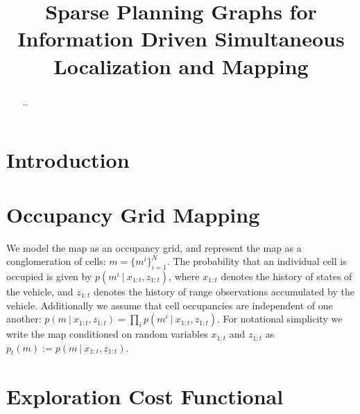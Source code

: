 \documentclass{article}
\begin{document}
\title{Sparse Planning Graphs for Information Driven Simultaneous Localization and Mapping}


\maketitle

\begin{abstract}
  \boldmath
  \dots
\end{abstract}

\section{Introduction}
\label{section:introduction}

\section{Occupancy Grid Mapping}
\label{section:occupancy_grid_mapping}

We model the map as an occupancy grid, and represent the map as a conglomeration of cells: $m = \{m^{i}\}_{i=1}^{N}$. The probability that an individual cell is occupied is given by $p\left(m^{i} \ \vert \ x_{1:t}, z_{1:t}\right)$, where $x_{1:t}$ denotes the history of states of the vehicle, and $z_{1:t}$ denotes the history of range observations accumulated by the vehicle. Additionally we assume that cell occupancies  are independent of one another: $p\left(m \ \vert \ x_{1:t}, z_{1:t}\right) = \prod_{i} p\left(m^{i} \ \vert \ x_{1:t}, z_{1:t}\right)$. For notational simplicity we write the map conditioned on random variables $x_{1:t}$ and $z_{1:t}$ as $p_{t}\left(m\right) := p\left(m \ \vert \ x_{1:t}, z_{1:t}\right)$.

\section{Exploration Cost Functional}
\label{section:exploration_cost_functional}
\end{document}
